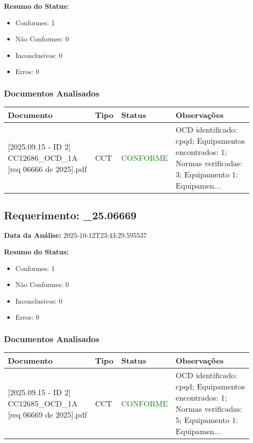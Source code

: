 \documentclass[12pt,a4paper]{article}
\begin{document}
\textbf{Resumo do Status:}
\begin{itemize}
    \item Conformes: 1
    \item Não Conformes: 0
    \item Inconclusivos: 0
    \item Erros: 0
\end{itemize}

\subsubsection{Documentos Analisados}

\begin{longtable}{|p{4cm}|p{2cm}|p{2cm}|p{6cm}|}
\hline
\textbf{Documento} & \textbf{Tipo} & \textbf{Status} & \textbf{Observações} \\
\hline
\endhead
[Certificado de Conformidade Técnica - CCT][2025.09.15 - ID 2] CC12686\_OCD\_1A [req 06666 de 2025].pdf & CCT & \textcolor{green}{CONFORME} & OCD identificado: cpqd; Equipamentos encontrados: 1; Normas verificadas: 3; Equipamento 1: Equipamen... \\
\hline
\end{longtable}


\subsection{Requerimento: \_25.06669}

\textbf{Data da Análise:} 2025-10-12T23:43:29.595537

\textbf{Resumo do Status:}
\begin{itemize}
    \item Conformes: 1
    \item Não Conformes: 0
    \item Inconclusivos: 0
    \item Erros: 0
\end{itemize}

\subsubsection{Documentos Analisados}

\begin{longtable}{|p{4cm}|p{2cm}|p{2cm}|p{6cm}|}
\hline
\textbf{Documento} & \textbf{Tipo} & \textbf{Status} & \textbf{Observações} \\
\hline
\endhead
[Certificado de Conformidade Técnica - CCT][2025.09.15 - ID 2] CC12685\_OCD\_1A [req 06669 de 2025].pdf & CCT & \textcolor{green}{CONFORME} & OCD identificado: cpqd; Equipamentos encontrados: 1; Normas verificadas: 5; Equipamento 1: Equipamen... \\
\hline
\end{longtable}
\end{document}
